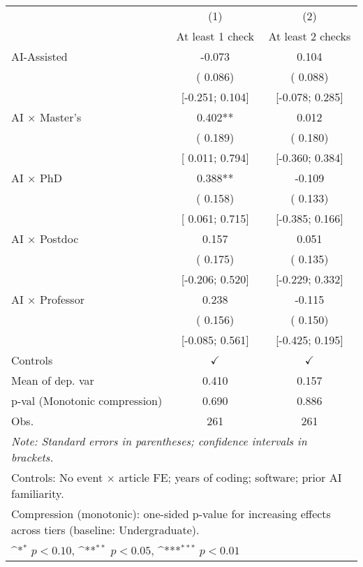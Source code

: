 \def\sym#1{\ifmmode^{#1}\else\(^{#1}\)\fi}
\begin{tabular}{l*{2}{c}}
\hline\hline
 & (1) & (2)
\\
 & At least 1 check & At least 2 checks
 \\
\hline
AI-Assisted & -0.073 &  0.104
\\
 & ( 0.086) & ( 0.088)
\\
 & [-0.251;  0.104] & [-0.078;  0.285]
\\
AI × Master's &  0.402** &  0.012
\\
 & ( 0.189) & ( 0.180)
\\
 & [ 0.011;  0.794] & [-0.360;  0.384]
\\
AI × PhD &  0.388** & -0.109
\\
 & ( 0.158) & ( 0.133)
\\
 & [ 0.061;  0.715] & [-0.385;  0.166]
\\
AI × Postdoc &  0.157 &  0.051
\\
 & ( 0.175) & ( 0.135)
\\
 & [-0.206;  0.520] & [-0.229;  0.332]
\\
AI × Professor &  0.238 & -0.115
\\
 & ( 0.156) & ( 0.150)
\\
 & [-0.085;  0.561] & [-0.425;  0.195]
\\
\hline
Controls & $\checkmark$ & $\checkmark$
\\
Mean of dep. var &  0.410 &  0.157
\\
p-val (Monotonic compression) &  0.690 &  0.886
\\
Obs. & 261 & 261
\\
\hline
\hline\hline
\multicolumn{3}{l}{\it{Note:} Standard errors in parentheses; confidence intervals in brackets.}\\
\multicolumn{3}{l}{Controls: No event $\times$ article FE; years of coding; software; prior AI familiarity.}\\
\multicolumn{3}{l}{Compression (monotonic): one-sided p-value for increasing effects across tiers (baseline: Undergraduate).}\\
\multicolumn{3}{l}{\sym{*} $p<0.10$, \sym{**} $p<0.05$,  \sym{***} $p<0.01$}\\
\end{tabular}
